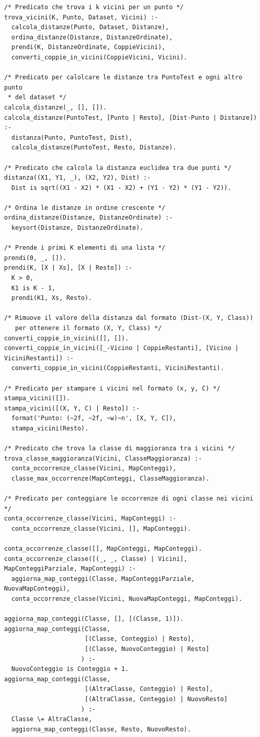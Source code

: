 \documentclass[11pt]{article}
\theoremstyle{definition}
\begin{document}
\begin{verbatim}
/* Predicato che trova i k vicini per un punto */
trova_vicini(K, Punto, Dataset, Vicini) :-
  calcola_distanze(Punto, Dataset, Distanze),
  ordina_distanze(Distanze, DistanzeOrdinate),
  prendi(K, DistanzeOrdinate, CoppieVicini),
  converti_coppie_in_vicini(CoppieVicini, Vicini).

/* Predicato per calolcare le distanze tra PuntoTest e ogni altro punto 
 * del dataset */
calcola_distanze(_, [], []).
calcola_distanze(PuntoTest, [Punto | Resto], [Dist-Punto | Distanze]) :-
  distanza(Punto, PuntoTest, Dist),
  calcola_distanze(PuntoTest, Resto, Distanze).
  
/* Predicato che calcola la distanza euclidea tra due punti */
distanza((X1, Y1, _), (X2, Y2), Dist) :-
  Dist is sqrt((X1 - X2) * (X1 - X2) + (Y1 - Y2) * (Y1 - Y2)).

/* Ordina le distanze in ordine crescente */
ordina_distanze(Distanze, DistanzeOrdinate) :-
  keysort(Distanze, DistanzeOrdinate).

/* Prende i primi K elementi di una lista */
prendi(0, _, []).
prendi(K, [X | Xs], [X | Resto]) :-
  K > 0,
  K1 is K - 1,
  prendi(K1, Xs, Resto).
  
/* Rimuove il valore della distanza dal formato (Dist-(X, Y, Class)) 
   per ottenere il formato (X, Y, Class) */
converti_coppie_in_vicini([], []).
converti_coppie_in_vicini([_-Vicino | CoppieRestanti], [Vicino | ViciniRestanti]) :-
  converti_coppie_in_vicini(CoppieRestanti, ViciniRestanti).
  
/* Predicato per stampare i vicini nel formato (x, y, C) */
stampa_vicini([]).
stampa_vicini([(X, Y, C) | Resto]) :-
  format('Punto: (~2f, ~2f, ~w)~n', [X, Y, C]),
  stampa_vicini(Resto).
  
/* Predicato che trova la classe di maggioranza tra i vicini */
trova_classe_maggioranza(Vicini, ClasseMaggioranza) :-
  conta_occorrenze_classe(Vicini, MapConteggi),
  classe_max_occorrenze(MapConteggi, ClasseMaggioranza).

/* Predicato per conteggiare le occorrenze di ogni classe nei vicini */
conta_occorrenze_classe(Vicini, MapConteggi) :-
  conta_occorrenze_classe(Vicini, [], MapConteggi).

conta_occorrenze_classe([], MapConteggi, MapConteggi).
conta_occorrenze_classe([(_, _, Classe) | Vicini], MapConteggiParziale, MapConteggi) :-
  aggiorna_map_conteggi(Classe, MapConteggiParziale, NuovaMapConteggi),
  conta_occorrenze_classe(Vicini, NuovaMapConteggi, MapConteggi).

aggiorna_map_conteggi(Classe, [], [(Classe, 1)]).
aggiorna_map_conteggi(Classe, 
                      [(Classe, Conteggio) | Resto], 
                      [(Classe, NuovoConteggio) | Resto]
                     ) :-
  NuovoConteggio is Conteggio + 1.
aggiorna_map_conteggi(Classe, 
                      [(AltraClasse, Conteggio) | Resto], 
                      [(AltraClasse, Conteggio) | NuovoResto]
                     ) :-
  Classe \= AltraClasse,
  aggiorna_map_conteggi(Classe, Resto, NuovoResto).


\end{verbatim}
\end{document}

